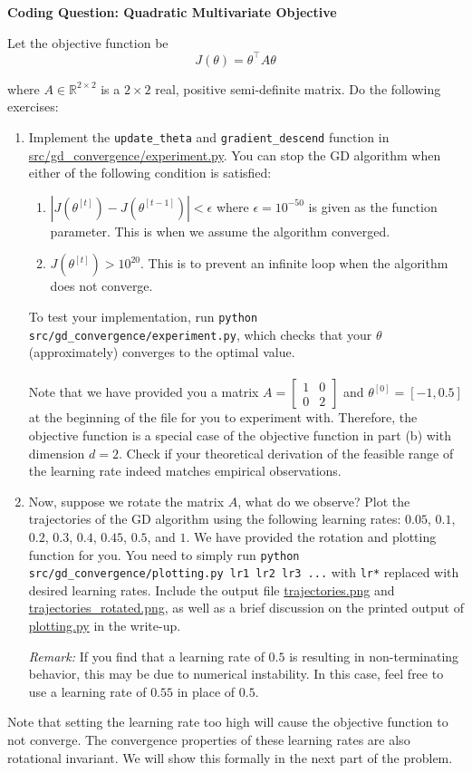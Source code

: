 \item {} {\bf Coding Question: Quadratic Multivariate Objective}

Let the objective function be 
\begin{equation*}
	J(\theta) = \theta^\top A\theta
\end{equation*}

where $A\in\mathbb{R}^{2\times 2}$ is a $2 \times 2$ real, positive semi-definite matrix. Do the following exercises:

\begin{enumerate}
	\item Implement the \texttt{update\_theta} and \texttt{gradient\_descend} function in \url{src/gd_convergence/experiment.py}. You can stop the GD algorithm when either of the following condition is satisfied:
	\begin{enumerate}
		\item $|J(\theta^{[t]}) - J(\theta^{[t-1]})| < \epsilon$ where $\epsilon=10^{-50}$ is given as the function parameter. This is when we assume the algorithm converged. 
		\item $J(\theta^{[t]}) > 10^{20}$. This is to prevent an infinite loop when the algorithm does not converge.
	\end{enumerate}
	To test your implementation, run \texttt{python src/gd\_convergence/experiment.py}, which checks that your $\theta$ (approximately) converges to the optimal value. \\
	\\
	Note that we have provided you a matrix $A=\begin{bmatrix} 1 & 0 \\ 0 & 2 \end{bmatrix}$ and $\theta^{[0]} = [-1, 0.5]$ at the beginning of the file for you to experiment with. Therefore, the objective function is a special case of the objective function in part (b) with dimension $d=2$. Check if your theoretical derivation of the feasible range of the learning rate indeed matches empirical observations. 
	\item Now, suppose we rotate the matrix $A$, what do we observe?
	 Plot the trajectories of the GD algorithm using the following learning rates: $0.05$, $0.1$, $0.2$, $0.3$, $0.4$, $0.45$, $0.5$, and $1$. We have provided the rotation and plotting function for you. You need to simply run \texttt{python src/gd\_convergence/plotting.py lr1 lr2 lr3 ...} with \texttt{lr*} replaced with desired learning rates. Include the output file \url{trajectories.png} and \url{trajectories_rotated.png}, as well as a brief discussion on the printed output of \url{plotting.py} in the write-up. 

     \smallskip

     \emph{Remark: } If you find that a learning rate of $0.5$ is resulting in non-terminating behavior, this may be due to numerical instability. In this case, feel free to use a learning rate of $0.55$ in place of $0.5$. 
\end{enumerate}

Note that setting the learning rate too high will cause the objective function to not converge. The convergence properties of these learning rates are also rotational invariant. We will show this formally in the next part of the problem.